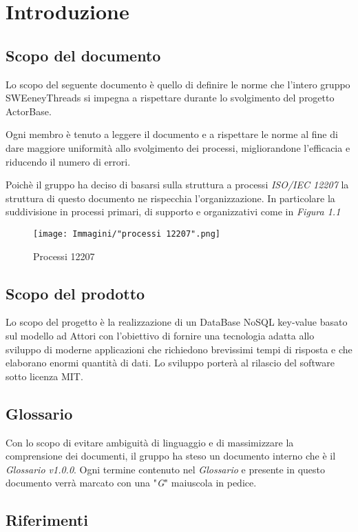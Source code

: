 \documentclass[a4paper]{report}
\newcommand{\mychapter}[2]{
    \setcounter{chapter}{#1}
    \setcounter{section}{0}
    \setcounter{subsection}{1}
    \chapter*{#2}
    \addcontentsline{toc}{chapter}{#2}
}
\begin{document}
	\tableofcontents
	
	\mychapter{1}{Introduzione}
		\section{Scopo del documento}
			Lo scopo del seguente documento è quello di definire le norme che l'intero gruppo SWEeneyThreads si impegna a rispettare durante lo svolgimento 
			del progetto ActorBase. 
			
			Ogni membro è tenuto a leggere il documento e a rispettare le norme al fine di dare maggiore uniformità allo svolgimento dei processi, 
			migliorandone l'efficacia e riducendo il numero di errori.
			
			Poichè il gruppo ha deciso di basarsi sulla struttura a processi \emph{ISO/IEC 12207} la struttura di questo documento ne rispecchia 
			l'organizzazione. In particolare la suddivisione in processi primari, di supporto e organizzativi come in \emph{Figura 1.1}
			\begin{figure}[h!]
				\centering
				\texttt{[image: Immagini/"processi 12207".png]}
				\caption{Processi 12207}
			\end{figure}
		\section{Scopo del prodotto}
			Lo scopo del progetto è la realizzazione di un DataBase NoSQL key-value basato sul modello ad Attori con l'obiettivo di fornire una 
			tecnologia adatta allo sviluppo di moderne applicazioni che richiedono brevissimi tempi di risposta e che elaborano enormi quantità 
			di dati. Lo sviluppo porterà al rilascio del software sotto licenza MIT.
		\section{Glossario}
			Con lo scopo di evitare ambiguità di linguaggio e di massimizzare la comprensione dei documenti, il gruppo ha steso un documento 
			interno che è il \emph{Glossario v1.0.0}. Ogni termine contenuto nel \emph{Glossario} e presente in questo documento verrà marcato 
			con una "\textit{G}" maiuscola in pedice.
		\section{Riferimenti}
\end{document}
